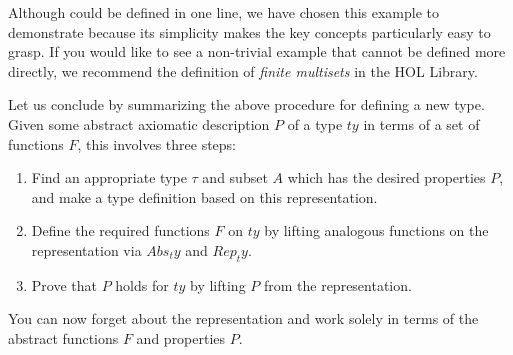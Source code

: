 \begin{isabellebody}
\begin{isamarkuptext}
Although  could be defined in one line, we have chosen this
example to demonstrate  because its simplicity makes the
key concepts particularly easy to grasp. If you would like to see a
non-trivial example that cannot be defined more directly, we recommend the
definition of \emph{finite multisets} in the HOL Library.

Let us conclude by summarizing the above procedure for defining a new type.
Given some abstract axiomatic description $P$ of a type $ty$ in terms of a
set of functions $F$, this involves three steps:
\begin{enumerate}
\item Find an appropriate type $\tau$ and subset $A$ which has the desired
  properties $P$, and make a type definition based on this representation.
\item Define the required functions $F$ on $ty$ by lifting
analogous functions on the representation via $Abs_ty$ and $Rep_ty$.
\item Prove that $P$ holds for $ty$ by lifting $P$ from the representation.
\end{enumerate}
You can now forget about the representation and work solely in terms of the
abstract functions $F$ and properties $P$.%
\end{isamarkuptext}%
\end{isabellebody}%
